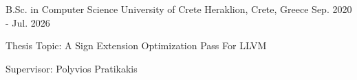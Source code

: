 

\begin{cventries}

  \cventry
    {B.Sc. in Computer Science} %
    {University of Crete} %
    {Heraklion, Crete, Greece} %
    {Sep. 2020 - Jul. 2026} %
    {
      \begin{cvitems} %
        \item {Thesis Topic: A Sign Extension Optimization Pass For LLVM}
        \item {Supervisor: Polyvios Pratikakis}
      \end{cvitems}
    }

\end{cventries}
